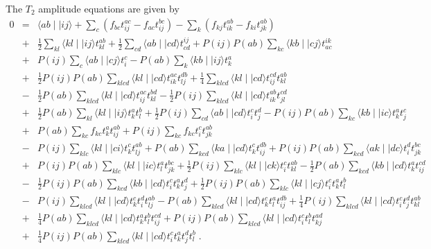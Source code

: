 \documentclass[twoside,12pt]{article}
\begin{document}
The $T_2$ amplitude equations are given by 
\begin{eqnarray}
0 & = & \langle ab \mid\mid ij \rangle 
+ \sum_c\left(f_{bc}t^{ac}_{ij} - f_{ac}t^{bc}_{ij}\right)
- \sum_k\left(f_{kj}t^{ab}_{ik} - f_{ki}t^{ab}_{jk}\right)  \nonumber \\
  & + & \frac{1}{2}\sum_{kl}\langle kl \mid \mid ij\rangle t_{kl}^{ab}
+ \frac{1}{2}\sum_{cd}\langle ab \mid \mid cd\rangle t_{cd}^{ij}
+ P(ij)P(ab)\sum_{kc}\langle kb \mid \mid cj\rangle t_{ac}^{ik} \nonumber \\
  & + & P(ij)\sum_c \langle ab \mid\mid cj\rangle t^c_i
- P(ab)\sum_k \langle kb \mid\mid ij\rangle t^a_k \nonumber \\
  & + & \frac{1}{2}P(ij)P(ab)\sum_{klcd} \langle kl\mid\mid cd \rangle 
        t_{ik}^{ac}t_{lj}^{db} 
+ \frac{1}{4}\sum_{klcd} \langle kl\mid\mid cd \rangle 
        t_{ij}^{cd}t_{kl}^{ab} \nonumber \\
&-& \frac{1}{2}P(ab)\sum_{klcd} \langle kl\mid\mid cd \rangle 
        t_{ij}^{ac}t_{kl}^{bd} 
- \frac{1}{2}P(ij)\sum_{klcd} \langle kl\mid\mid cd \rangle 
        t_{ik}^{ab}t_{jl}^{cd}  \nonumber \\
  & + & \frac{1}{2}P(ab)\sum_{kl}\langle kl \mid\mid ij\rangle t^a_kt^b_l
+ \frac{1}{2}P(ij)\sum_{cd}\langle ab\mid\mid cd\rangle t^c_i t^d_j
- P(ij)P(ab)\sum_{kc}\langle kb\mid\mid ic\rangle t^a_k t^c_j \nonumber \\
  & + & P(ab) \sum_{kc} f_{kc} t^a_k t^{ab}_{ij} 
+  P(ij) \sum_{kc} f_{kc} t^c_i t^{ab}_{jk}  \nonumber \\
  & - & P(ij)\sum_{klc} \langle kl\mid\mid ci\rangle t^c_k t^{ab}_{lj}
+  P(ab)\sum_{kcd} \langle ka\mid\mid cd\rangle t^c_k t^{db}_{ij}
+  P(ij)P(ab)\sum_{kcd} \langle ak\mid\mid dc\rangle t^d_i t^{bc}_{jk}
   \nonumber \\
  & + & P(ij)P(ab)\sum_{klc} \langle kl\mid\mid ic\rangle t^a_l t^{bc}_{jk}
+ \frac{1}{2} P(ij)\sum_{klc} \langle kl\mid\mid ck\rangle t^c_i t^{ab}_{kl}
- \frac{1}{2} P(ab)\sum_{kcd} \langle kb\mid\mid cd\rangle t^a_k t^{cd}_{ij}
  \nonumber \\
  & - & \frac{1}{2} P(ij)P(ab)\sum_{kcd}\langle kb\mid\mid cd \rangle 
         t^c_it^a_kt^d_j
+ \frac{1}{2} P(ij)P(ab)\sum_{klc}\langle kl\mid\mid cj \rangle 
         t^c_it^a_kt^b_l \nonumber \\
  & - & P(ij)\sum_{klcd} \langle kl \mid\mid cd \rangle t^c_k t^d_i t^{ab}_{lj}
- P(ab)\sum_{klcd} \langle kl \mid\mid cd \rangle t^c_k t^a_l t^{db}_{ij}
+ \frac{1}{4}P(ij)\sum_{klcd} \langle kl \mid\mid cd \rangle 
    t^c_i t^d_j t^{ab}_{kl} \nonumber \\
  & + & \frac{1}{4}P(ab)\sum_{klcd} \langle kl \mid\mid cd \rangle 
    t^a_k t^b_l t^{cd}_{ij} 
+ P(ij)P(ab)\sum_{klcd} \langle kl \mid\mid cd \rangle 
t^c_i t^b_l t^{ad}_{kj}\nonumber \\
&+& \frac{1}{4}P(ij)P(ab)\sum_{klcd} \langle kl \mid\mid cd \rangle 
  t^c_i t^a_k t^d_j t^b_l \;.
\label{t2_eqn}
\end{eqnarray}
\end{document}
